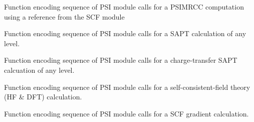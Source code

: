 \documentclass[letterpaper,10pt,english]{sphinxmanual}
\begin{document}

\begin{fulllineitems}
\label{index:proc.run_psimrcc_scf}
Function encoding sequence of PSI module calls for a PSIMRCC computation
using a reference from the SCF module

\end{fulllineitems}


\begin{fulllineitems}
\label{index:proc.run_sapt}
Function encoding sequence of PSI module calls for
a SAPT calculation of any level.

\end{fulllineitems}


\begin{fulllineitems}
\label{index:proc.run_sapt_ct}
Function encoding sequence of PSI module calls for
a charge-transfer SAPT calcuation of any level.

\end{fulllineitems}


\begin{fulllineitems}
\label{index:proc.run_scf}
Function encoding sequence of PSI module calls for
a self-consistent-field theory (HF \& DFT) calculation.

\end{fulllineitems}


\begin{fulllineitems}
\label{index:proc.run_scf_gradient}
Function encoding sequence of PSI module calls for
a SCF gradient calculation.

\end{fulllineitems}

\end{document}
